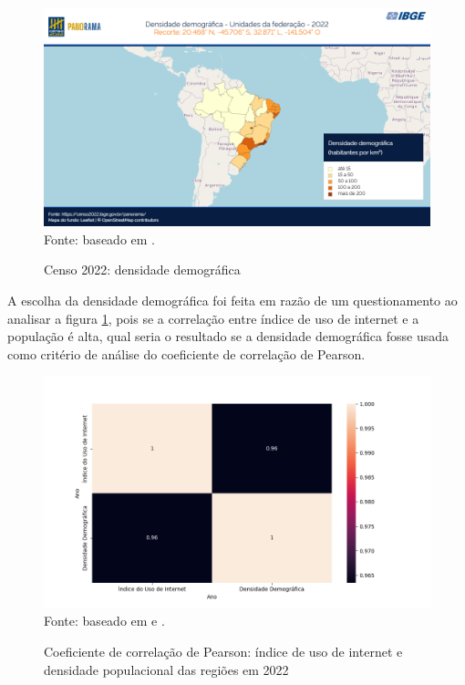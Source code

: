 \begin{figure}[H]
    \centering
    \caption{Censo 2022: densidade demográfica}
    \includegraphics[width=1\linewidth]{figuras/populacao/censo_2022_densidade_demografica.png}
    \label{fig:densidade_demografica}
    \footnotesize{Fonte: baseado em \cite{IBGE_censo_2022}.}
\end{figure}

A escolha da densidade demográfica foi feita em razão de um questionamento ao analisar a figura \ref{fig:densidade_demografica}, pois se a correlação entre índice de uso de internet e a população é alta, qual seria o resultado se a densidade demográfica fosse usada como critério de análise do coeficiente de correlação de Pearson.

\begin{figure}[H]
    \centering
    \caption{Coeficiente de correlação de Pearson: índice de uso de internet e densidade populacional das regiões em 2022}
    \includegraphics[width=1\linewidth]{figuras/internet/correlacao2.png}
    \label{fig:correlacao2}
    \footnotesize{Fonte: baseado em \cite{IBGE_censo_2022} e \cite{pnda_continua_anual_2016_2023}.}
\end{figure}

